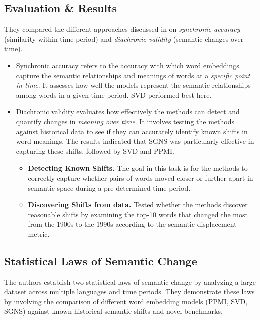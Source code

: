 \subsection{Evaluation \& Results}\label{subsec:evaluation&results}
They compared the different approaches discussed in  on \emph{synchronic accuracy} (similarity within time-period) and \emph{diachronic validity} (semantic changes over time).
\begin{itemize}
    \item {}
    Synchronic accuracy refers to the accuracy with which word embeddings capture the semantic relationships and meanings of words at a \emph{specific point in time}.
    It assesses how well the models represent the semantic relationships among words in a given time period.
    SVD performed best here.
    \item {}
    Diachronic validity evaluates how effectively the methods can detect and quantify changes in \emph{meaning over time}.
    It involves testing the methods against historical data to see if they can accurately identify known shifts in word meanings.
    The results indicated that SGNS was particularly effective in capturing these shifts, followed by SVD and PPMI\@.
    \begin{itemize}
        \item \textbf{Detecting Known Shifts.}
        The goal in this task is for the methods to correctly capture whether pairs of words moved closer or further apart in semantic space during a pre-determined time-period.

        \item \textbf{Discovering Shifts from data.}
        Tested whether the methods discover reasonable shifts by examining the top-10 words that changed the most from the 1900s to the 1990s according to the semantic displacement metric.
    \end{itemize}

\end{itemize}

\subsection{Statistical Laws of Semantic Change}\label{subsec:statistical-laws-of-semantic-change}
The authors establish two statistical laws of semantic change by analyzing a large dataset across multiple languages and time periods.
They demonstrate these laws by involving the comparison of different word embedding models (PPMI, SVD, SGNS) against known historical semantic shifts and novel benchmarks.

